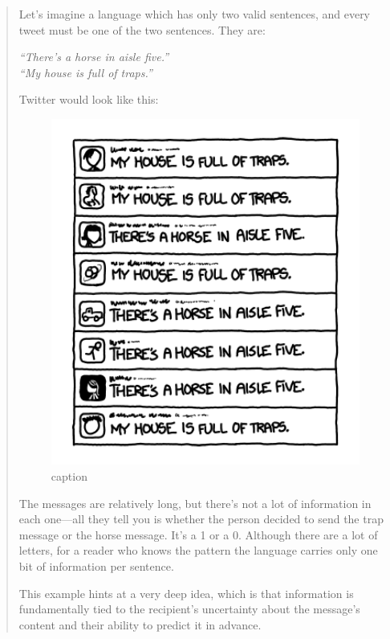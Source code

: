 \begin{quotation}
Let's imagine a language which has only two valid sentences, and every tweet must be one of the two sentences. They are:

{\em
“There’s a horse in aisle five.”\\
“My house is full of traps.”
}

Twitter would look like this:

\begin{figure}[h]
\begin{center}
\includegraphics[width=4in]{huffman/twitter-screenshot.png}
\end{center}
\caption{caption} %
\end{figure}


The messages are relatively long, but there’s not a lot of information in each one—all they tell you is whether the person decided to send the trap message or the horse message. It’s a 1 or a 0. Although there are a lot of letters, for a reader who knows the pattern the language carries only one bit of information per sentence.

This example hints at a very deep idea, which is that information is fundamentally tied to the recipient’s uncertainty about the message’s content and their ability to predict it in advance.


\end{quotation}
